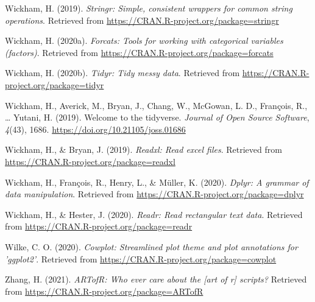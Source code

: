 \documentclass[
  english,
  man,floatsintext]{apa6}
\newlength{\cslhangindent}
\newlength{\cslentryspacingunit} %
\newenvironment{CSLReferences}[2] %
 {%
  \setlength{\parindent}{0pt}
  \ifodd #1
  \let\oldpar\par
  \def\par{\hangindent=\cslhangindent\oldpar}
  \fi
  \setlength{\parskip}{#2\cslentryspacingunit}
 }%
 {}
\begin{document}
\begin{CSLReferences}{1}{0}
\leavevmode{}%
Wickham, H. (2019). \emph{Stringr: Simple, consistent wrappers for common string operations}. Retrieved from \url{https://CRAN.R-project.org/package=stringr}

\leavevmode{}%
Wickham, H. (2020a). \emph{Forcats: Tools for working with categorical variables (factors)}. Retrieved from \url{https://CRAN.R-project.org/package=forcats}

\leavevmode{}%
Wickham, H. (2020b). \emph{Tidyr: Tidy messy data}. Retrieved from \url{https://CRAN.R-project.org/package=tidyr}

\leavevmode{}%
Wickham, H., Averick, M., Bryan, J., Chang, W., McGowan, L. D., François, R., \ldots{} Yutani, H. (2019). Welcome to the {tidyverse}. \emph{Journal of Open Source Software}, \emph{4}(43), 1686. \url{https://doi.org/10.21105/joss.01686}

\leavevmode{}%
Wickham, H., \& Bryan, J. (2019). \emph{Readxl: Read excel files}. Retrieved from \url{https://CRAN.R-project.org/package=readxl}

\leavevmode{}%
Wickham, H., François, R., Henry, L., \& Müller, K. (2020). \emph{Dplyr: A grammar of data manipulation}. Retrieved from \url{https://CRAN.R-project.org/package=dplyr}

\leavevmode{}%
Wickham, H., \& Hester, J. (2020). \emph{Readr: Read rectangular text data}. Retrieved from \url{https://CRAN.R-project.org/package=readr}

\leavevmode{}%
Wilke, C. O. (2020). \emph{Cowplot: Streamlined plot theme and plot annotations for 'ggplot2'}. Retrieved from \url{https://CRAN.R-project.org/package=cowplot}

\leavevmode{}%
Zhang, H. (2021). \emph{ARTofR: Who ever care about the {[}art of r{]} scripts?} Retrieved from \url{https://CRAN.R-project.org/package=ARTofR}

\end{CSLReferences}

\endgroup
\end{document}
